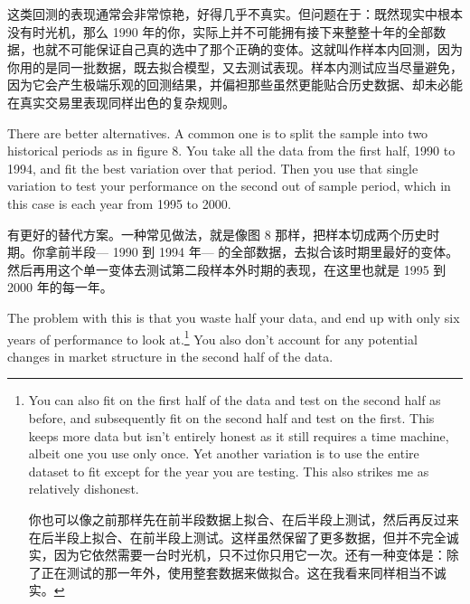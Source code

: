 \begin{chineseblock}这类回测的表现通常会非常惊艳，好得几乎不真实。但问题在于：既然现实中根本没有时光机，那么 1990 年的你，实际上并不可能拥有接下来整整十年的全部数据，也就不可能保证自己真的选中了那个正确的变体。这就叫作样本内回测，因为你用的是同一批数据，既去拟合模型，又去测试表现。样本内测试应当尽量避免，因为它会产生极端乐观的回测结果，并偏袒那些虽然更能贴合历史数据、却未必能在真实交易里表现同样出色的复杂规则。\end{chineseblock}

\bipairgap

\begin{englishblock} There are better alternatives. A common one is to split the sample into two historical periods as in figure 8. You take all the data from the first half, 1990 to 1994, and fit the best variation over that period. Then you use that single variation to test your performance on the second out of sample period, which in this case is each year from 1995 to 2000. \end{englishblock}

\begin{chineseblock}有更好的替代方案。一种常见做法，就是像图 8 那样，把样本切成两个历史时期。你拿前半段--- 1990 到 1994 年--- 的全部数据，去拟合该时期里最好的变体。然后再用这个单一变体去测试第二段样本外时期的表现，在这里也就是 1995 到 2000 年的每一年。\end{chineseblock}

\bipairgap

\begin{englishblock} The problem with this is that you waste half your data, and end up with only six years of performance to look at.\footnote{You can also fit on the first half of the data and test on the second half as before, and subsequently fit on the second half and test on the first. This keeps more data but isn't entirely honest as it still requires a time machine, albeit one you use only once. Yet another variation is to use the entire dataset to fit except for the year you are testing. This also strikes me as relatively dishonest. \par 你也可以像之前那样先在前半段数据上拟合、在后半段上测试，然后再反过来在后半段上拟合、在前半段上测试。这样虽然保留了更多数据，但并不完全诚实，因为它依然需要一台时光机，只不过你只用它一次。还有一种变体是：除了正在测试的那一年外，使用整套数据来做拟合。这在我看来同样相当不诚实。} You also don't account for any potential changes in market structure in the second half of the data. \end{englishblock}

